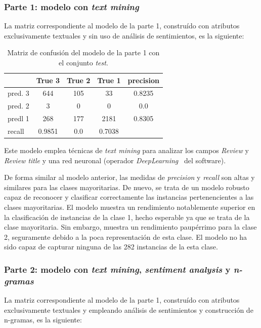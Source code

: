 \documentclass[es]{uc3mreport}
\begin{document}
\begin{report}
\subsubsection{Parte 1: modelo con \textit{text mining}}
\label{eva-modeloparte1}
La matriz correspondiente al modelo de la parte 1, construído con atributos
exclusivamente textuales y sin uso de análisis de sentimientos, es la siguiente:

\begin{table}
\begin{tabular}{@{}lccc|c@{}}
    \toprule
             & True 3 & True 2 & True 1 & precision\\
    \midrule
    pred. 3  & 644 & 105       & 33     & 0.8235   \\
    pred. 2  & 3   & 0         & 0      & 0.0      \\
    predl 1  & 268 & 177       & 2181   & 0.8305   \\
    \midrule
    recall   & 0.9851 & 0.0 & 0.7038 &          \\
    \bottomrule
\end{tabular}
\caption{Matriz de confusión del modelo de la parte 1 con el conjunto \textit{test}.}
\end{table}

Este modelo emplea técnicas de \textit{text mining} para analizar los campos
\textit{Review} y \textit{Review title} y una red neuronal (operador
\textit{DeepLearning}~\cite{deeplearning} del software). 

De forma similar al modelo anterior, las medidas de \textit{precision} y
\textit{recall} son altas y similares para las clases mayoritarias. De nuevo, se
trata de un modelo robusto capaz de reconocer y clasificar correctamente las
instancias pertenencientes a las clases mayoritarias. El modelo muestra un
rendimiento notablemente superior en la clasificación de instancias de la clase
1, hecho esperable ya que se trata de la clase mayoritaria. Sin embargo, muestra un
rendimiento paupérrimo para la clase 2, seguramente debido a la poca
representación de esta clase. El modelo no ha sido capaz de capturar ninguna de
las 282 instancias de la esta clase.

\subsubsection{Parte 2: modelo con \textit{text mining}, \textit{sentiment
analysis} y \textit{n-gramas}}
\label{eva-modeloparte2}

La matriz correspondiente al modelo de la parte 1, construído con atributos
exclusivamente textuales y empleando análisis de sentimientos y construcción de
n-gramas, es la siguiente:


\end{report}
\end{document}
